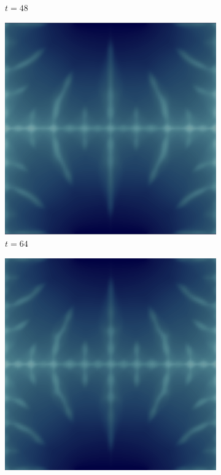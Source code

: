 \begin{figure}[H]
\begin{subfigure}{.4\textwidth}
        \caption{$t = 48$}
    \end{subfigure}
    \begin{subfigure}{.4\textwidth}
        \includegraphics[width=\textwidth]{imgs/UnitSquare2_State/fifth.png}
        \caption{$t = 64$}
    \end{subfigure}
    \begin{subfigure}{.4\textwidth}
        \includegraphics[width=\textwidth]{imgs/UnitSquare2_State/sixth.png}

\end{subfigure}
\end{figure}
